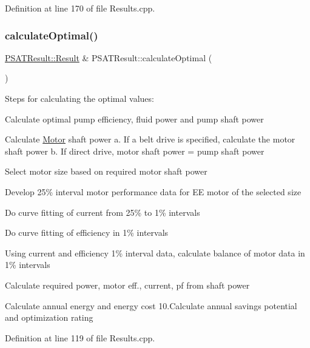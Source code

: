 Definition at line 170 of file Results.\+cpp.

\mbox{\label{class_p_s_a_t_result_af8ddf3ade8aaca5724201ee177894d1a}} 
\subsubsection{\texorpdfstring{calculate\+Optimal()}{calculateOptimal()}}
{\footnotesize\ttfamily \hyperlink{struct_p_s_a_t_result_1_1_result}{P\+S\+A\+T\+Result\+::\+Result} \& P\+S\+A\+T\+Result\+::calculate\+Optimal (\begin{DoxyParamCaption}{ }\end{DoxyParamCaption})}

Steps for calculating the optimal values\+:
\begin{DoxyEnumerate}
\item Calculate optimal pump efficiency, fluid power and pump shaft power
\item Calculate \hyperlink{struct_motor}{Motor} shaft power a. If a belt drive is specified, calculate the motor shaft power b. If direct drive, motor shaft power = pump shaft power
\item Select motor size based on required motor shaft power
\item Develop 25\% interval motor performance data for EE motor of the selected size
\item Do curve fitting of current from 25\% to 1\% intervals
\item Do curve fitting of efficiency in 1\% intervals
\item Using current and efficiency 1\% interval data, calculate balance of motor data in 1\% intervals
\item Calculate required power, motor eff., current, pf from shaft power
\item Calculate annual energy and energy cost 10.\+Calculate annual savings potential and optimization rating
\end{DoxyEnumerate}

Definition at line 119 of file Results.\+cpp.

\mbox{\label{class_p_s_a_t_result_a14fc75c2e0e92f74e3df1b97ed13b496}} 
